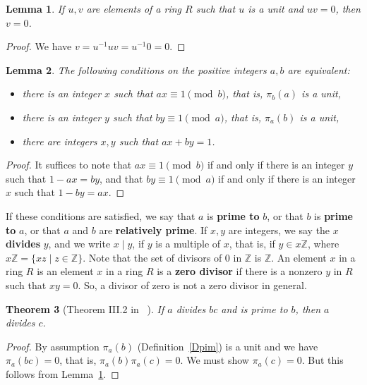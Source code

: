 \documentclass[12pt,letterpaper]{article}
\newcommand{\Z}{\mathbb{Z}}
\newtheorem{thm}{Theorem}%
\newtheorem{lem}[thm]{Lemma} %
\theoremstyle{definition}
\begin{document}
\begin{lem}\label{Luv} 
If $u,v$ are elements of a ring $R$ such that $u$ is a unit and $uv=0$, then $v=0$. 
\end{lem} 

\begin{proof} 
We have $v=u^{-1}uv=u^{-1}0=0$.
\end{proof} 

\begin{lem}\label{Lbez} 
The following conditions on the positive integers $a,b$ are equivalent: 
\begin{itemize}
  \item[\emph{(a)}] there is an integer $x$ such that $ax \equiv 1 \pmod{b}$, that is, $\pi_b(a)$ is a unit, 
  \item[\emph{(b)}] there is an integer $y$ such that $by \equiv 1 \pmod{a}$, that is, $\pi_a(b)$ is a unit, 
  \item[\emph{(c)}] there are integers $x,y$ such that $ax + by =1$. 
\end{itemize}
\end{lem} 

\begin{proof} 
It suffices to note that $ax \equiv 1 \pmod{b}$ if and only if there is an integer $y$ such that $1-ax=by$, and that $by \equiv 1 \pmod{a}$ if and only if there is an integer $x$ such that $1-by=ax$. 
\end{proof} 

If these conditions are satisfied, we say that $a$ is \textbf{prime to} $b$,  or that $b$ is \textbf{prime to} $a$, or that $a$ and $b$ are \textbf{relatively prime}.  If $x,y$ are integers, we say the $x$ \textbf{divides}  $y$, and we write $x\mid y$, if $y$ is a multiple of $x$, that is, if $y\in x\Z$, where $x\Z=\{xz\mid z\in\Z\}$. Note that the set of divisors of $0$ in $\Z$ is $\Z$. An element $x$ in a ring $R$ is an element $x$ in a ring $R$ is a \textbf{zero divisor} if there is a nonzero $y$ in $R$ such that $xy=0$. So, a divisor of zero is not a zero divisor in general. 

\begin{thm}[Theorem III.2 in ~\cite{weil1979}]\label{Teucl}
If $a$ divides $bc$ and is prime to $b$, then $a$ divides $c$. 
\end{thm} 

\begin{proof} 
By assumption $\pi_a(b)$ (Definition~\ref{Dpim}) is a unit and we have $\pi_a(bc)=0$, that is, $\pi_a(b)\pi_a(c)=0$. We must show $\pi_a(c)=0$. But this follows from Lemma~\ref{Luv}. 
\end{proof} 
\end{document}
